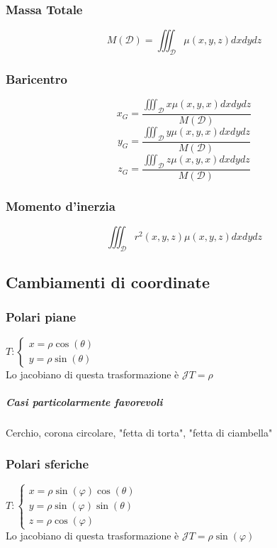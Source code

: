 \documentclass[10pt,a4paper]{report}
\begin{document}
			\subsubsection{Massa Totale}
			\[ M(\mathcal{D})= \iiint_{\mathcal{D}} \mu(x,y,z) dx dy dz \]
			
			\subsubsection{Baricentro}
			\[ x_{G}=\frac{\iiint_{\mathcal{D}} x \mu (x,y,x) dx dy dz}{ M(\mathcal{D})} \]
			\[ y_{G}=\frac{\iiint_{\mathcal{D}} y \mu (x,y,x) dx dy dz}{ M(\mathcal{D})} \]
			\[ z_{G}=\frac{\iiint_{\mathcal{D}} z \mu (x,y,x) dx dy dz}{ M(\mathcal{D})} \]
			
			\subsubsection{Momento d'inerzia}
			\[ \iiint_{\mathcal{D}} r^{2}(x,y,z) \mu(x,y,z) dx dy dz \]

		\subsection*{Cambiamenti di coordinate}
			\subsubsection{Polari piane}
			$ T: \begin{cases} 
				x=\rho \cos(\theta) \\ 
				y=\rho \sin(\theta)
			\end{cases} $
            \\
           	Lo jacobiano di questa trasformazione è $\mathcal{J}T=\rho $
				\subparagraph{Casi particolarmente favorevoli}
				Cerchio, corona circolare, "fetta di torta", "fetta di ciambella"
			\subsubsection{Polari sferiche}
			$ T: \begin{cases} 
				x=\rho \sin(\varphi)\cos(\theta) \\ 
				y=\rho \sin(\varphi)\sin(\theta) \\
				z=\rho \cos(\varphi)
			\end{cases} $
			\\
			Lo jacobiano di questa trasformazione è $\mathcal{J}T=\rho \sin(\varphi) $
			
\end{document}
